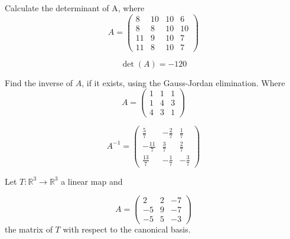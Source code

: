 \begin{questions}

\question Calculate the determinant of A, where
$$
A=\left(\begin{array}{rrrr}
8 & 10 & 10 & 6 \\
8 & 8 & 10 & 10 \\
11 & 9 & 10 & 7 \\
11 & 8 & 10 & 7
\end{array}\right)
$$

\begin{solution}
$$\det(A)=-120$$
\end{solution}

\question Find the inverse of $A$, if it exists, using the Gauss-Jordan elimination. Where
$$
A=\left(\begin{array}{rrr}
1 & 1 & 1 \\
1 & 4 & 3 \\
4 & 3 & 1
\end{array}\right)
$$

\begin{solution}
$$A^{-1}=\left(\begin{array}{rrr}
\frac{5}{7} & -\frac{2}{7} & \frac{1}{7} \\
-\frac{11}{7} & \frac{3}{7} & \frac{2}{7} \\
\frac{13}{7} & -\frac{1}{7} & -\frac{3}{7}
\end{array}\right)$$
\end{solution}

\question Let $T:\mathbb{R}^3\rightarrow\mathbb{R}^3$  a linear map and
 
$$
A=\left(\begin{array}{rrr}
2 & 2 & -7 \\
-5 & 9 & -7 \\
-5 & 5 & -3
\end{array}\right)
$$
the matrix of $T$ with respect to the canonical basis.
\end{questions}
